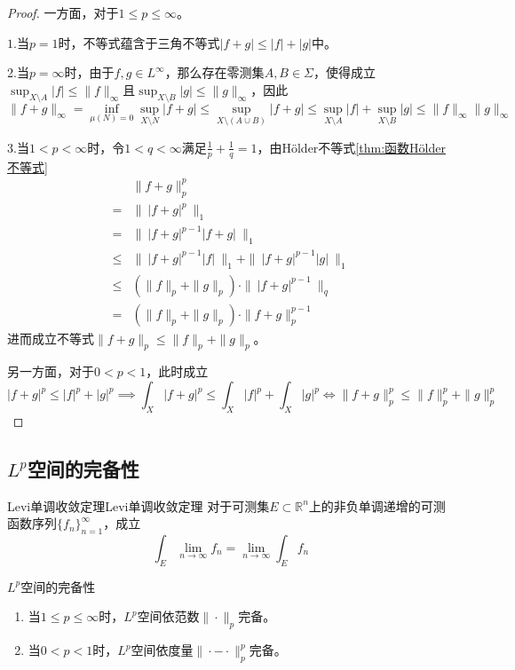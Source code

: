 \documentclass[lang = cn, scheme = chinese, thmcnt = section]{elegantbook}
\newcommand{\R}{\mathbb{R}}            %
\newcommand{\sub}{\subset}             %
\begin{document}
\begin{proof}
	一方面，对于$1\le p\le \infty$。
	
	$1.$当$p=1$时，不等式蕴含于三角不等式$|f+g|\le|f|+|g|$中。
	
	2.当$p=\infty$时，由于$f,g\in L^\infty$，那么存在零测集$A,B\in\Sigma$，使得成立$\displaystyle\sup_{X\setminus A}|f|\le \|f\|_{\infty}$且$\displaystyle\sup_{X\setminus B}|g|\le \|g\|_{\infty}$，因此
	$$
	\|f+g\|_\infty
	=\inf_{\mu(N)=0}\sup_{X\setminus N}|f+g|
	\le \sup_{X\setminus(A\cup B)}|f+g|
	\le\sup_{X\setminus A}|f|+\sup_{X\setminus B}|g|
	\le\|f\|_\infty\|g\|_\infty
	$$
	
	3.当$1<p<\infty$时，令$1<q<\infty$满足$\frac{1}{p}+\frac{1}{q}=1$，由Hölder不等式\ref{thm:函数Hölder不等式}
	\nonumber\begin{align}
		&\|f+g\|_p^p\\
		=&\| \ |f+g|^p \ \|_1\\
		=&\| \ |f+g|^{p-1}|f+g| \ \|_1\\
		\le&\| \ |f+g|^{p-1}|f| \ \|_1+\| \ |f+g|^{p-1}|g| \ \|_1\\
		\le & (\|f\|_p+\|g\|_p) \cdot \| \ |f+g|^{p-1} \ \|_q\\
		=&(\|f\|_p+\|g\|_p)\cdot\| f+g\|_p^{p-1}
	\end{align}
	进而成立不等式$\|f+g\|_p\le\|f\|_p+\|g\|_p$。
	
	另一方面，对于$0<p<1$，此时成立
	$$
	|f+g|^p\le |f|^p+|g|^p\implies \int_X|f+g|^p\le \int_X |f|^p+\int_X |g|^p\iff \|f+g\|_p^p\le\|f\|_p^p+\|g\|_p^p
	$$
\end{proof}

\subsection{$L^p$空间的完备性}

\begin{theorem}{Levi单调收敛定理}{Levi单调收敛定理}
	对于可测集$E\sub\R^n$上的非负单调递增的可测函数序列$\{ f_n \}_{n=1}^{\infty}$，成立
	$$
	\int_E\lim_{n\to\infty}f_n=\lim_{n\to\infty}\int_Ef_n
	$$
\end{theorem}

\begin{theorem}{$L^p$空间的完备性}
	\begin{enumerate}
		\item 当$1\le p\le\infty$时，$L^p$空间依范数$\|\cdot\|_p$完备。
		\item 当$0<p<1$时，$L^p$空间依度量$\|\cdot-\cdot\|_p^p$完备。
	\end{enumerate}
\end{theorem}
\end{document}
